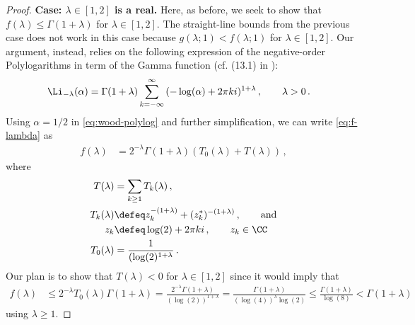 \begin{proof}
    \noindent
    \textbf{Case: $\lambda \in [1, 2]$ is a real.}
    Here, as before, we seek to show that $f(\lambda) \leq \Gamma(1+\lambda)$ for $\lambda \in [1,2]$. 
    The straight-line bounds from the previous case does not work in this case 
    because $g(\lambda; 1) < f(\lambda; 1)$ for $\lambda \in [1, 2]$. 
    Our argument, instead, relies on the following expression of the negative-order Polylogarithms 
    in term of the Gamma function (cf. (13.1) in \cite{wood1992polylog}):
    \begin{align}\label{eq:wood-polylog}
        \Li_{-\lambda}(\alpha) &= \Gamma(1+\lambda) \sum_{k = -\infty}^\infty{ (- \log(\alpha) + 2 \pi k i)^{1+\lambda}}
        \, , \qquad \lambda > 0
        \, .
    \end{align}
    Using $\alpha = 1/2$ in \eqref{eq:wood-polylog} and further simplification, we can write \eqref{eq:f-lambda} as
    \begin{align}\label{eq:f-lambda-T}
        f(\lambda) &= 2^{-\lambda}\Gamma(1+\lambda) \left( T_0(\lambda) + T(\lambda) \right)
        \, ,
    \end{align}
    where
    \begin{align*}
        T(\lambda) &= \sum_{k \geq 1}{T_k(\lambda)}\, , \\
        T_k(\lambda) &\defeq z_k^{-(1+\lambda)} + (z_k^*)^{-(1+\lambda)}\, , \qquad \text{and} \\
        z_k &\defeq \log(2) + 2\pi k i\, , \qquad z_k \in \CC \\
        T_0(\lambda) &= \frac{1}{ (\log(2)^{1+\lambda} }
        \, .
    \end{align*}
    Our plan is to show that $T(\lambda) < 0$ for $\lambda \in [1,2]$ 
    since it would imply that
    \begin{align*}
        f(\lambda) 
        &\leq 2^{-\lambda} T_0(\lambda) \Gamma(1+\lambda)
        = \frac{2^{-\lambda} \Gamma(1+\lambda)}{ (\log(2))^{1+\lambda} }  
        = \frac{\Gamma(1+\lambda)}{(\log(4))^\lambda \log(2)} 
        \leq \frac{\Gamma(1+\lambda)}{\log(8)}
        < \Gamma(1+\lambda)
    \end{align*}
    using $\lambda \geq 1$.


\end{proof}
